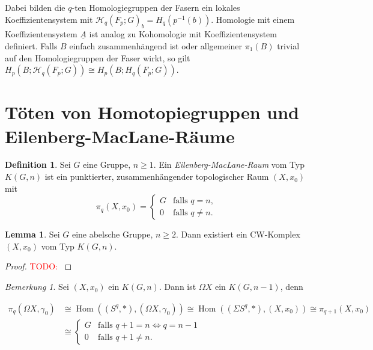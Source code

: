 \documentclass[11pt, a4paper, german]{article}
\theoremstyle{definition}
\newtheorem{lem}{Lemma}
\newtheorem{defn}{Definition}
\theoremstyle{remark}
\newtheorem*{bem}{Bemerkung}
\newcommand{\TODO}[1]{\textcolor{red}{TODO: #1}} %
\DeclareMathOperator{\Hom}{Hom} %
\newcommand{\LH}{\mathcal{H}} %
\begin{document}

Dabei bilden die $q$-ten Homologiegruppen der Fasern ein lokales Koeffizientensystem mit $\LH_q(F_p; G)_b = H_q(p^{-1}(b))$.
Homologie mit einem Koeffizientensystem $\underline{A}$ ist analog zu Kohomologie mit Koeffizientensystem definiert.
Falls $B$ einfach zusammenhängend ist oder allgemeiner $\pi_1(B)$ trivial auf den Homologiegruppen der Faser wirkt, so gilt $H_p(B; \LH_q(F_p; G)) \cong H_p(B; H_q(F_p; G))$.

\section{Töten von Homotopiegruppen und Eilenberg-MacLane-Räume}

\begin{defn}
  Sei $G$ eine Gruppe, $n \geq 1$.
  Ein \emph{Eilenberg-MacLane-Raum} vom Typ $K(G, n)$ ist ein punktierter, zusammenhängender topologischer Raum $(X, x_0)$ mit
  \[
    \pi_q(X, x_0) = \begin{cases}
      G & \text{falls $q = n$,} \\
      0 & \text{falls $q \neq n$.}
    \end{cases}
  \]
\end{defn}

\begin{lem}
  Sei $G$ eine abelsche Gruppe, $n \geq 2$.
  Dann existiert ein CW-Komplex $(X, x_0)$ vom Typ $K(G, n)$.
\end{lem}

\begin{proof}
  \TODO{}
\end{proof}


\begin{bem}
  Sei $(X, x_0)$ ein $K(G, n)$. Dann ist $\Omega X$ ein $K(G, n-1)$, denn

  \begin{align*}
    \pi_q(\Omega X, \gamma_0) & \cong \Hom((S^q, *), (\Omega X, \gamma_0))
    \cong \Hom((\Sigma S^q, *), (X, x_0))
    \cong \pi_{q+1}(X, x_0) \\
    & \cong \begin{cases}
      G & \text{falls $q+1 = n \iff q = n-1$} \\
      0 & \text{falls $q+1 \neq n$.}
    \end{cases}
  \end{align*}
\end{bem}
\end{document}
